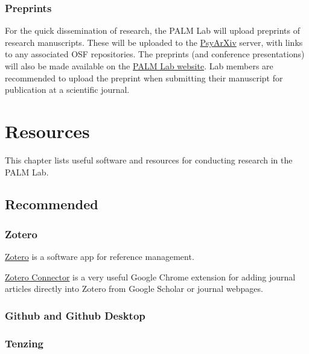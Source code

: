 \documentclass[
]{book}
\theoremstyle{definition}
\theoremstyle{definition}
\theoremstyle{definition}
\theoremstyle{definition}
\theoremstyle{remark}
\begin{document}
\hypertarget{preprints}{%
\subsection{Preprints}\label{preprints}}

For the quick dissemination of research, the PALM Lab will upload preprints of research manuscripts. These will be uploaded to the \href{https://psyarxiv.com}{PsyArXiv} server, with links to any associated OSF repositories. The preprints (and conference presentations) will also be made available on the \href{https://palm-lab.github.io}{PALM Lab website}. Lab members are recommended to upload the preprint when submitting their manuscript for publication at a scientific journal.

\hypertarget{resources}{%
\chapter{Resources}\label{resources}}

This chapter lists useful software and resources for conducting research in the PALM Lab.

\hypertarget{recommended}{%
\section{Recommended}\label{recommended}}

\hypertarget{zotero}{%
\subsection{Zotero}\label{zotero}}

\href{https://www.zotero.org/}{Zotero} is a software app for reference management.

\href{https://www.zotero.org/download/connectors}{Zotero Connector} is a very useful Google Chrome extension for adding journal articles directly into Zotero from Google Scholar or journal webpages.

\hypertarget{github-and-github-desktop}{%
\subsection{Github and Github Desktop}\label{github-and-github-desktop}}

\hypertarget{tenzing}{%
\subsection{Tenzing}\label{tenzing}}
\end{document}
